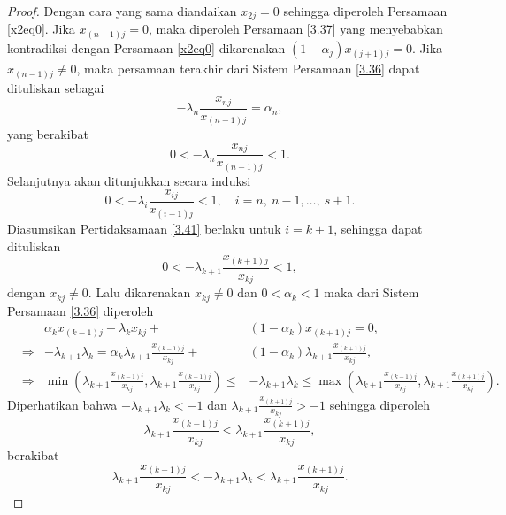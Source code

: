 \begin{proof}
    Dengan cara yang sama diandaikan $x_{2j} = 0$ sehingga diperoleh Persamaan \eqref{x2eq0}. Jika $x_{(n-1)j} = 0$, maka diperoleh Persamaan \eqref{3.37} yang menyebabkan kontradiksi dengan Persamaan \eqref{x2eq0} dikarenakan $(1 - \alpha_j )x_{(j+1)j} = 0$. Jika $x_{(n-1)j} \neq 0$, maka persamaan terakhir dari Sistem Persamaan \eqref{3.36} dapat dituliskan sebagai
    \begin{equation*}
        -\lambda_n\frac{x_{nj}}{x_{(n-1)j}} = \alpha_n,
    \end{equation*}
    yang berakibat
    \begin{equation*}
        0 < -\lambda_n\frac{x_{nj}}{x_{(n-1)j}} < 1.
    \end{equation*}
    Selanjutnya akan ditunjukkan secara induksi
    \begin{equation}
        0 < -\lambda_i\frac{x_{ij}}{x_{(i-1)j}} < 1, \quad i=n,~n-1,\dots,~s+1. \label{3.41}
    \end{equation}
    Diasumsikan Pertidaksamaan \eqref{3.41} berlaku untuk $i=k+1$, sehingga dapat dituliskan
    \begin{equation*}
        0 < -\lambda_{k+1}\frac{x_{(k+1)j}}{x_{kj}} < 1,
    \end{equation*}
    dengan $x_{kj} \neq 0$. Lalu dikarenakan $x_{kj} \neq 0$ dan $0<\alpha_k<1$ maka dari Sistem Persamaan \eqref{3.36} diperoleh
    \begin{align*}
         &&\alpha_kx_{(k-1)j} + \lambda_kx_{kj} +& (1 - \alpha_k)x_{(k+1)j} = 0, \\
         &\Longrightarrow&-\lambda_{k+1}\lambda_{k}=\alpha_k\lambda_{k+1}\frac{x_{(k-1)j}}{x_{kj}} +& (1 - \alpha_k)\lambda_{k+1}\frac{x_{(k+1)j}}{x_{kj}}, \\
         &\Longrightarrow&\min(\lambda_{k+1}\frac{x_{(k-1)j}}{x_{kj}},\lambda_{k+1}\frac{x_{(k+1)j}}{x_{kj}}) \leq & -\lambda_{k+1}\lambda_{k} \leq \max(\lambda_{k+1}\frac{x_{(k-1)j}}{x_{kj}},\lambda_{k+1}\frac{x_{(k+1)j}}{x_{kj}}).
    \end{align*}
    Diperhatikan bahwa $-\lambda_{k+1}\lambda_{k} < -1$ dan $\lambda_{k+1}\frac{x_{(k+1)j}}{x_{kj}} > -1$ sehingga diperoleh 
    \begin{equation*}
        \lambda_{k+1}\frac{x_{(k-1)j}}{x_{kj}} < \lambda_{k+1}\frac{x_{(k+1)j}}{x_{kj}},
    \end{equation*}
    berakibat
    \begin{equation}\label{3.42}
        \lambda_{k+1}\frac{x_{(k-1)j}}{x_{kj}} < -\lambda_{k+1}\lambda_{k} < \lambda_{k+1}\frac{x_{(k+1)j}}{x_{kj}}.

\end{equation}
\end{proof}
